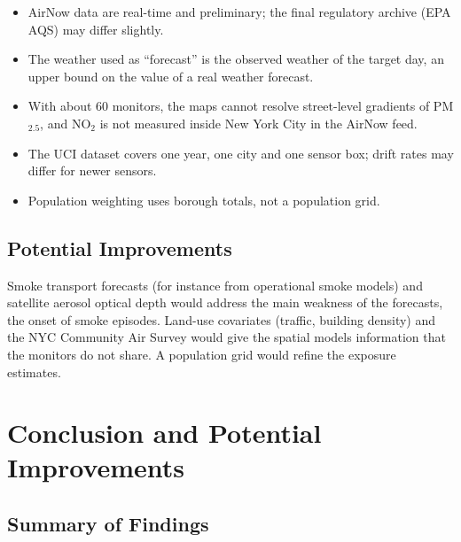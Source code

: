 \documentclass[11pt]{article}
\begin{document}
\begin{itemize}
\item AirNow data are real-time and preliminary; the final regulatory archive (EPA AQS) may differ slightly.
\item The weather used as ``forecast'' is the observed weather of the target day, an upper bound on the value of a real weather forecast.
\item With about 60 monitors, the maps cannot resolve street-level gradients of PM$_{2.5}$, and NO$_2$ is not measured inside New York City in the AirNow feed.
\item The UCI dataset covers one year, one city and one sensor box; drift rates may differ for newer sensors.
\item Population weighting uses borough totals, not a population grid.
\end{itemize}

\subsection{Potential Improvements}

Smoke transport forecasts (for instance from operational smoke models) and satellite aerosol optical depth would address the main weakness of the forecasts, the onset of smoke episodes. Land-use covariates (traffic, building density) and the NYC Community Air Survey would give the spatial models information that the monitors do not share. A population grid would refine the exposure estimates.

\section{Conclusion and Potential Improvements}

\subsection{Summary of Findings}
\end{document}
